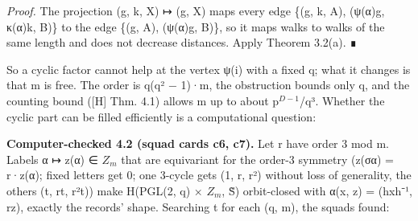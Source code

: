 \documentclass[
  10pt,
]{article}
\begin{document}
\emph{Proof.} The projection (g, k, X) ↦ (g, X) maps every edge \{(g, k,
A), (ψ(α)g, κ(α)k, B)\} to the edge \{(g, A), (ψ(α)g, B)\}, so it maps
walks to walks of the same length and does not decrease distances. Apply
Theorem 3.2(a). ∎

So a cyclic factor cannot help at the vertex ψ(i) with a fixed q; what
it changes is that m is free. The order is q(q² − 1)·m, the obstruction
bounds only q, and the counting bound ({[}H{]} Thm. 4.1) allows m up to
about p\(^{D−1}\)/q³. Whether the cyclic part can be filled efficiently
is a computational question:

\textbf{Computer-checked 4.2 (squad cards c6, c7).} Let r have order 3
mod m. Labels α ↦ z(α) ∈ \(Z_{m}\) that are equivariant for the order-3
symmetry (z(σα) = r·z(α); fixed letters get 0; one 3-cycle gets (1, r,
r²) without loss of generality, the others (t, rt, r²t)) make H(PGL(2,
q) × \(Z_{m}\), S̃) orbit-closed with α(x, z) = (hxh⁻¹, rz), exactly the
records' shape. Searching t for each (q, m), the squads found:
\end{document}
